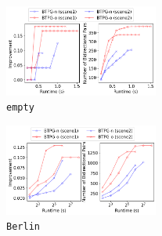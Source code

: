 \documentclass[letterpaper]{article} %
\theoremstyle{definition}
\begin{document}
\begin{figure}[h]
    \centering
    \includegraphics[width=0.45\textwidth]{Figs/anytime_empty.png}
    \caption{\texttt{empty}}
\end{figure}
\begin{figure}[h]
    \centering
    \includegraphics[width=0.45\textwidth]{Figs/anytime_berlin.png}
    \caption{\texttt{Berlin}}
\end{figure}
\end{document}
